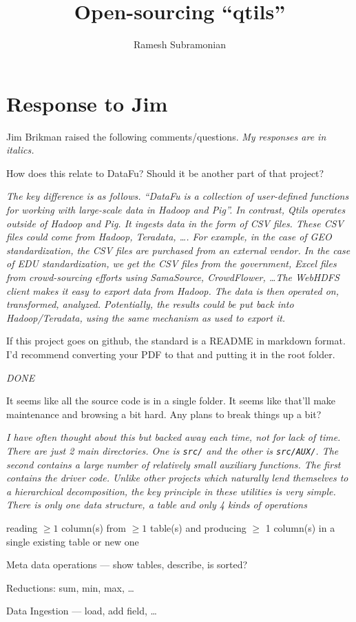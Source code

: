 \documentclass[letterpaper]{article}
\begin{document}
\title{Open-sourcing ``qtils''}
\author{ Ramesh Subramonian }
\maketitle
\thispagestyle{fancy}
\lhead{}
\chead{}
\rhead{}
\cfoot{}
\rfoot{{\small \thepage}}

\section{Response to Jim}

Jim Brikman raised the following comments/questions. 
{\it My responses are in italics.}
\be
\item 
How does this relate to DataFu? Should it be another part of that project?

{\it The key difference is as follows. ``DataFu is a collection of user-defined
functions for working with large-scale data {\em in Hadoop and Pig}''. In
contrast, Qtils operates {\em outside} of Hadoop and Pig. 
It ingests data in the form of CSV files. These CSV files could come
from Hadoop, Teradata, \ldots. For example, in the case of GEO
standardization, the CSV files are purchased from an external vendor. In
the case of EDU standardization, we get the CSV files from the government,
Excel files from crowd-sourcing efforts using SamaSource, CrowdFlower,
\ldots The WebHDFS client makes it easy to
export data from Hadoop. The data is then operated on, transformed,
analyzed.  Potentially, the results could be put back into
Hadoop/Teradata, using the same mechanism as used to export it.
}
\item If this project goes on github, the standard is a README in
markdown format. I'd recommend converting your PDF to that and
putting it in the root folder.

{\it DONE}

\item It seems like all the source code is in a single folder. It
seems like that'll make maintenance and browsing a bit hard.
Any plans to break things up a bit?

{\it I have often thought about this but backed away each time, not for
  lack of time. There are just 2 main directories. One is \verb+src/+
and the other is \verb+src/AUX/+. The second contains a large number of
relatively small auxiliary functions. The first contains the driver
code. Unlike other projects which naturally lend themselves to a
hierarchical decomposition, the key principle in these utilities is very
simple. There is only one data structure, a table and only 4 kinds of
operations
\be
\item reading \(\geq 1\) column(s) from \(\geq 1\) table(s) and
producing \(\geq\) 1 column(s) in a single existing table or new one
\item Meta data operations --- show tables, describe, is sorted?
\item Reductions: sum, min, max, \ldots
\item Data Ingestion --- load, add field, \ldots
\ee

}
\end{document}
